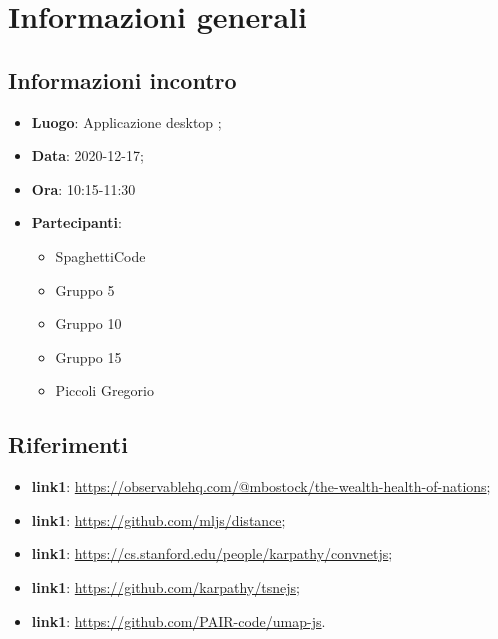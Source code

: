 \documentclass{article}
\begin{document}


\section{Informazioni generali}
\label{sec:info_generali}

\subsection{Informazioni incontro}
\label{sub:info_incontro}

\begin{itemize}
	\item \textbf{Luogo}: Applicazione desktop ;
	\item \textbf{Data}: 2020-12-17;
	\item \textbf{Ora}: 10:15-11:30
	\item \textbf{Partecipanti}:
	\begin{itemize}
		\item SpaghettiCode
		\item Gruppo 5
		\item Gruppo 10
		\item Gruppo 15
		\item Piccoli Gregorio
	\end{itemize}
\end{itemize}

\subsection{Riferimenti}%
\label{sub:riferimenti}

\begin{itemize}
    \item \textbf{link1}: \url{https://observablehq.com/@mbostock/the-wealth-health-of-nations};
    \item \textbf{link1}: \url{https://github.com/mljs/distance};
    \item \textbf{link1}: \url{https://cs.stanford.edu/people/karpathy/convnetjs};
    \item \textbf{link1}: \url{https://github.com/karpathy/tsnejs};
    \item \textbf{link1}: \url{https://github.com/PAIR-code/umap-js}.
  \end{itemize}
\end{document}
